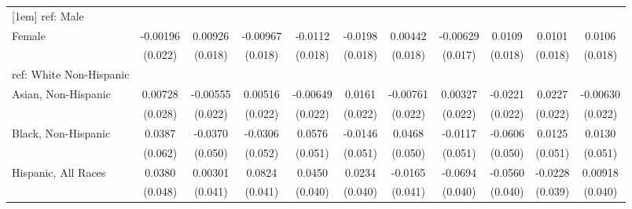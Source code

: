 \begin{table}[htbp]
\begin{tabular}{l*{10}{c}}
[1em]
ref: Male&                     &                     &                     &                     &                     &                     &                     &                     &                     &                     \\
[1em]
Female&    -0.00196         &     0.00926         &    -0.00967         &     -0.0112         &     -0.0198         &     0.00442         &    -0.00629         &      0.0109         &      0.0101         &      0.0106         \\
  &     (0.022)         &     (0.018)         &     (0.018)         &     (0.018)         &     (0.018)         &     (0.018)         &     (0.017)         &     (0.018)         &     (0.018)         &     (0.018)         \\
[1em]
ref: White Non-Hispanic&                     &                     &                     &                     &                     &                     &                     &                     &                     &                     \\
[1em]
Asian, Non-Hispanic&     0.00728         &    -0.00555         &     0.00516         &    -0.00649         &      0.0161         &    -0.00761         &     0.00327         &     -0.0221         &      0.0227         &    -0.00630         \\
  &     (0.028)         &     (0.022)         &     (0.022)         &     (0.022)         &     (0.022)         &     (0.022)         &     (0.022)         &     (0.022)         &     (0.022)         &     (0.022)         \\
[1em]
Black, Non-Hispanic&      0.0387         &     -0.0370         &     -0.0306         &      0.0576         &     -0.0146         &      0.0468         &     -0.0117         &     -0.0606         &      0.0125         &      0.0130         \\
  &     (0.062)         &     (0.050)         &     (0.052)         &     (0.051)         &     (0.051)         &     (0.050)         &     (0.051)         &     (0.050)         &     (0.051)         &     (0.051)         \\
[1em]
Hispanic, All Races&      0.0380         &     0.00301         &      0.0824\sym{**} &      0.0450         &      0.0234         &     -0.0165         &     -0.0694\sym{*}  &     -0.0560         &     -0.0228         &     0.00918         \\
  &     (0.048)         &     (0.041)         &     (0.041)         &     (0.040)         &     (0.040)         &     (0.041)         &     (0.040)         &     (0.040)         &     (0.039)         &     (0.040)         \\

\end{tabular}
\end{table}
